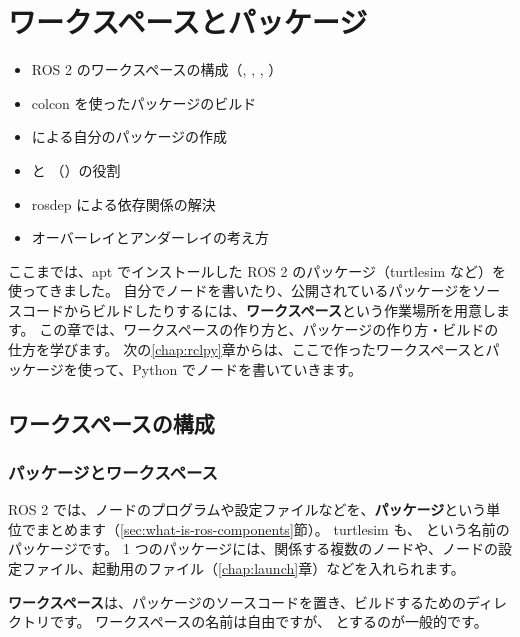 \chapter{ワークスペースとパッケージ}
\label{chap:workspace}

\begin{goalbox}
  \begin{itemize}
    \item ROS 2 のワークスペースの構成（, , , ）
    \item colcon を使ったパッケージのビルド
    \item {} による自分のパッケージの作成
    \item {} と （）の役割
    \item rosdep による依存関係の解決
    \item オーバーレイとアンダーレイの考え方
  \end{itemize}
\end{goalbox}

ここまでは、apt でインストールした ROS 2 のパッケージ（turtlesim など）を使ってきました。
自分でノードを書いたり、公開されているパッケージをソースコードからビルドしたりするには、\textbf{ワークスペース}という作業場所を用意します。
この章では、ワークスペースの作り方と、パッケージの作り方・ビルドの仕方を学びます。
次の\ref{chap:rclpy}章からは、ここで作ったワークスペースとパッケージを使って、Python でノードを書いていきます。

\section{ワークスペースの構成}
\label{sec:workspace-structure}

\subsection{パッケージとワークスペース}

ROS 2 では、ノードのプログラムや設定ファイルなどを、\textbf{パッケージ}という単位でまとめます（\ref{sec:what-is-ros-components}節）。
turtlesim も、 という名前のパッケージです。
1 つのパッケージには、関係する複数のノードや、ノードの設定ファイル、起動用のファイル（\ref{chap:launch}章）などを入れられます。

\textbf{ワークスペース}は、パッケージのソースコードを置き、ビルドするためのディレクトリです。
ワークスペースの名前は自由ですが、 とするのが一般的です。

